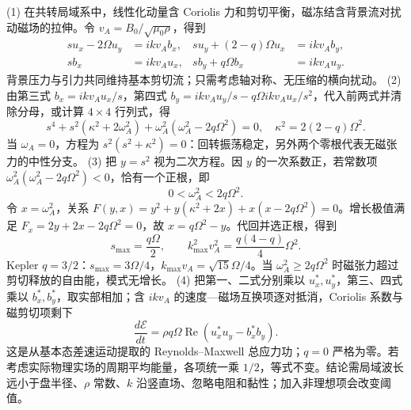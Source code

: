 (1) 在共转局域系中，线性化动量含 Coriolis 力和剪切平衡，磁冻结含背景流对扰动磁场的拉伸。令 \(v_A=B_0/\sqrt{\mu_0\rho}\)，得到
\[
\begin{aligned}
s u_x-2\Omega u_y&=ikv_A b_x,&
s u_y+(2-q)\Omega u_x&=ikv_A b_y,\\
s b_x&=ikv_A u_x,&
s b_y+q\Omega b_x&=ikv_A u_y.
\end{aligned}
\]
背景压力与引力共同维持基本剪切流；只需考虑轴对称、无压缩的横向扰动。
(2) 由第三式 \(b_x=ikv_Au_x/s\)，第四式 \(b_y=ikv_Au_y/s-q\Omega ikv_Au_x/s^2\)，代入前两式并清除分母，或计算 \(4\times4\) 行列式，得
\[
\boxed{s^4+s^2(\kappa^2+2\omega_A^2)+\omega_A^2(\omega_A^2-2q\Omega^2)=0},\quad
\kappa^2=2(2-q)\Omega^2.
\]
当 \(\omega_A=0\)，方程为 \(s^2(s^2+\kappa^2)=0\)：回转振荡稳定，另外两个零根代表无磁张力的中性分支。
(3) 把 \(y=s^2\) 视为二次方程。因 \(y\) 的一次系数正，若常数项 \(\omega_A^2(\omega_A^2-2q\Omega^2)<0\)，恰有一个正根，即
\[
0<\omega_A^2<2q\Omega^2.
\]
令 \(x=\omega_A^2\)，关系 \(F(y,x)=y^2+y(\kappa^2+2x)+x(x-2q\Omega^2)=0\)。增长极值满足 \(F_x=2y+2x-2q\Omega^2=0\)，故 \(x=q\Omega^2-y\)。代回并选正根，得到
\[
s_{\max}=\frac{q\Omega}{2},\qquad
k_{\max}^2v_A^2=\frac{q(4-q)}4\Omega^2.
\]
Kepler \(q=3/2\)：\(s_{\max}=3\Omega/4\)，\(k_{\max}v_A=\sqrt{15}\Omega/4\)。当 \(\omega_A^2\ge2q\Omega^2\) 时磁张力超过剪切释放的自由能，模式无增长。
(4) 把第一、二式分别乘以 \(u_x^*,u_y^*\)，第三、四式乘以 \(b_x^*,b_y^*\)，取实部相加；含 \(ikv_A\) 的速度—磁场互换项逐对抵消，Coriolis 系数与磁剪切项剩下
\[
\boxed{\frac{d\mathcal E}{dt}=\rho q\Omega\operatorname{Re}(u_x^*u_y-b_x^*b_y)}.
\]
这是从基本态差速运动提取的 Reynolds–Maxwell 总应力功；\(q=0\) 严格为零。若考虑实际物理实场的周期平均能量，各项统一乘 \(1/2\)，等式不变。结论需局域波长远小于盘半径、\(\rho\) 常数、\(k\) 沿竖直场、忽略电阻和黏性；加入非理想项会改变阈值。
